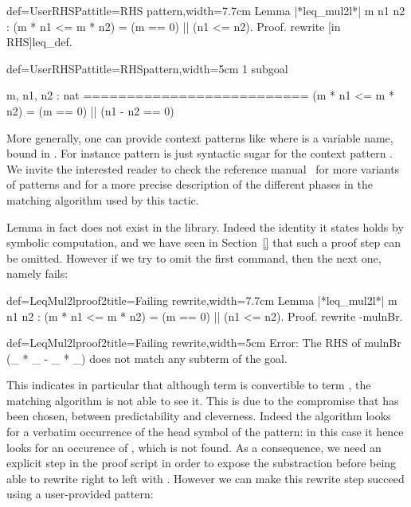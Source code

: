\begin{coq}{def=UserRHSPat}{title=RHS pattern,width=7.7cm}
Lemma |*leq_mul2l*| m n1 n2 :
(m * n1 <= m * n2) = (m == 0) || (n1 <= n2).
Proof.
rewrite [in RHS]leq_def.
\end{coq}
\begin{coqout}{def=UserRHSPat}{title=RHSpattern,width=5cm}
1 subgoal

m, n1, n2 : nat
==========================
(m * n1 <= m * n2) =
(m == 0) || (n1 - n2 == 0)
\end{coqout}

More generally, one can provide context patterns like \C{[in X in T]}
where  is a variable name, bound in . For instance pattern
\C{[in RHS]} is just syntactic sugar for the context pattern
\C{[in X in _ = X]}.  We invite the interested reader to check the
reference manual~\cite{ssrman} for more variants of patterns and for a
more precise description of the different phases in the matching
algorithm used by this tactic.

Lemma  in fact does not exist in the library. Indeed the
identity it states holds by symbolic computation, and we have seen in
Section~\ref{} that such a proof step can be omitted. However if we
try to omit the first  command, then the next one,
namely  fails:

\begin{coq}{def=LeqMul2lproof2}{title=Failing rewrite,width=7.7cm}
Lemma |*leq_mul2l*| m n1 n2 :
(m * n1 <= m * n2) = (m == 0) || (n1 <= n2).
Proof.
rewrite -mulnBr.
\end{coq}
\begin{coqout}{def=LeqMul2lproof2}{title=Failing rewrite,width=5cm}
Error: The RHS of mulnBr (_ * _ - _ * _) does not match any subterm of
the goal.
\end{coqout}

This indicates in particular that although term 
is convertible to term , the matching
algorithm is not able to see it. This is due to the compromise that
has been chosen, between predictability and cleverness. Indeed the
algorithm looks for a verbatim occurrence of the head symbol of the
pattern: in this case it hence looks for an occurence of \C{_ - _},
which is not found. As a consequence, we need an explicit step in the
proof script in order to expose the substraction before being able to
rewrite right to left with . However we can make this
rewrite step succeed using a user-provided pattern:


